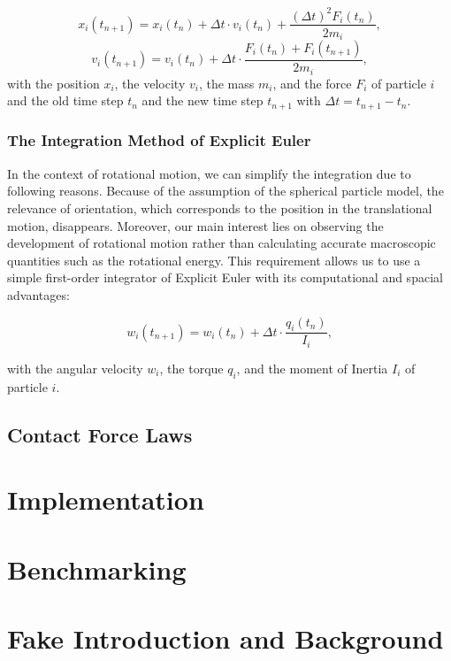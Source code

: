 \documentclass[11pt,
               a4paper,
               bibtotoc,
               idxtotoc,
               headsepline,
               footsepline,
               footexclude,
               BCOR12mm,
               DIV13,
               openany,   %
               ]
               {scrbook}
\begin{document}
\begin{equation}
	x_i(t_{n+1}) = x_i(t_n) + \Delta t \cdot v_i(t_n) + \frac{(\Delta t)^2 F_i(t_n)}{2m_i}, 
\end{equation}
\begin{equation}
	v_i(t_{n+1}) = v_i(t_n) + \Delta t \cdot \frac{F_i(t_n) + F_i(t_{n+1})}{2m_i},
\end{equation}
with the position $x_i$, the velocity $v_i$, the mass $m_i$, and the force $F_i$ of particle $i$ and the old time step $t_n$ and the new time step $t_{n+1}$ with $\Delta t = t_{n+1} - t_n$.

\section{The Integration Method of Explicit Euler}
In the context of rotational motion, we can simplify the integration due to following reasons. Because of the assumption of the spherical particle model, the relevance of orientation, which corresponds to the position in the translational motion, disappears. Moreover, our main interest lies on observing the development of rotational motion rather than calculating accurate macroscopic quantities such as the rotational energy. This requirement allows us to use a simple first-order integrator of Explicit Euler with its computational and spacial advantages:

\begin{equation}
	w_i(t_{n+1}) = w_i(t_n) + \Delta t \cdot \frac{q_i(t_n)}{I_i},
\end{equation}

with the angular velocity $w_i$, the torque $q_i$, and the moment of Inertia $I_i$ of particle $i$.

\chapter{Contact Force Laws}

\part{Implementation}

\part{Benchmarking}

\part{Fake Introduction and Background}
\end{document}
